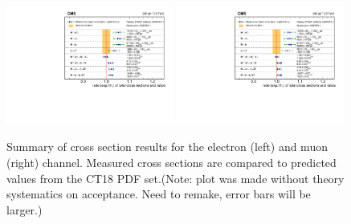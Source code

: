 \begin{figure}[htpb]
\includegraphics[width=0.49\textwidth]{plots/Results/xsecSummary13TeV_ele_ct18.pdf}
\includegraphics[width=0.49\textwidth]{plots/Results/xsecSummary13TeV_muon_ct18.pdf}
\caption{Summary of cross section results for the \sh electron (left) and muon (right) channel. Measured cross sections are compared to predicted values from the CT18 PDF set.(Note: plot was made without theory systematics on acceptance. Need to remake, error bars will be larger.)}
\label{fig:xs:ct18:13}
\end{figure}
